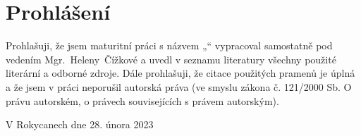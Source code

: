 \vspace*{\fill}

\chapter*{Prohlášení}

\begin{sloppypar}
Prohlašuji, že jsem maturitní práci s názvem „\thetitle“ vypracoval samostatně pod vedením \mbox{Mgr. Heleny Čížkové} a uvedl v seznamu literatury všechny použité literární a odborné zdroje. Dále prohlašuji, že citace použitých pramenů je úplná a že jsem v práci neporušil autorská práva (ve smyslu zákona č. 121/2000 Sb. O právu autorském, o právech souvisejících s právem autorským).
\end{sloppypar}

V Rokycanech dne 28. února 2023

\vspace*{1.5cm}

\begin{flushright}
    \hspace*{0.5\textwidth}\dotfill
    \\
    \theauthor\hspace*{0.05\textwidth}
\end{flushright}

\vspace*{1cm}
